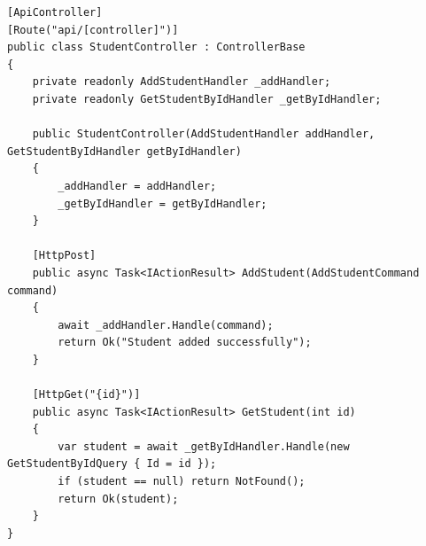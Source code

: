 \begin{lstlisting}
[ApiController]
[Route("api/[controller]")]
public class StudentController : ControllerBase
{
    private readonly AddStudentHandler _addHandler;
    private readonly GetStudentByIdHandler _getByIdHandler;

    public StudentController(AddStudentHandler addHandler, GetStudentByIdHandler getByIdHandler)
    {
        _addHandler = addHandler;
        _getByIdHandler = getByIdHandler;
    }

    [HttpPost]
    public async Task<IActionResult> AddStudent(AddStudentCommand command)
    {
        await _addHandler.Handle(command);
        return Ok("Student added successfully");
    }

    [HttpGet("{id}")]
    public async Task<IActionResult> GetStudent(int id)
    {
        var student = await _getByIdHandler.Handle(new GetStudentByIdQuery { Id = id });
        if (student == null) return NotFound();
        return Ok(student);
    }
}

\end{lstlisting}


\medskip

